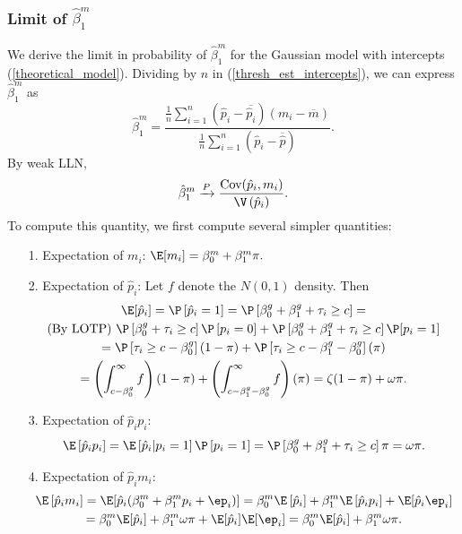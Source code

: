 \documentclass[12pt]{article}
\begin{document}
\subsubsection{Limit of $\hat{\beta}^m_1$}

We derive the limit in probability of $\hat{\beta}^m_1$ for the Gaussian model with intercepts (\ref{theoretical_model}). Dividing by $n$ in (\ref{thresh_est_intercepts}), we can express $\hat{\beta}^m_1$ as
$$ \hat{\beta}^m_1 = \frac{ \frac{1}{n} \sum_{i=1}^n ( \hat{p}_i - \overline{\hat{p}_i})(m_i - \overline{m})}{ \frac{1}{n} \sum_{i=1}^n (\hat{p}_i - \overline{\hat{p}})}.$$ By weak LLN,
$$ \hat{\beta}^m_1 \xrightarrow{P} \frac{\textrm{Cov}(\hat{p}_i, m_i)}{\V\left(\hat{p}_i\right)}.$$ To compute this quantity, we first compute several simpler quantities:
\begin{itemize}
\item[1.] Expectation of $m_i$: $\E[m_i] = \beta^m_0 + \beta^m_1\pi.$
\item[2.] Expectation of $\hat{p}_i$: Let $f$ denote the $N(0,1)$ density. Then \begin{multline*}
\E[\hat{p}_i] = \P\left[\hat{p}_i = 1\right] = \P\left[\beta^g_0 + \beta^g_1 + \tau_i \geq c \right] = \\ \textrm{(By LOTP) } \P\left[ \beta^g_0 + \tau_i \geq c \right]\P\left[p_i = 0\right] + \P\left[ \beta^g_0 + \beta^g_1 + \tau_i \geq c \right] \P[p_i = 1] \\ = \P\left[ \tau_i \geq c - \beta^g_0\right](1- \pi) + \P\left[ \tau_i \geq c - \beta^g_1 - \beta^g_0 \right](\pi) \\ = \left(\int_{c - \beta^g_0}^\infty f\right) (1 - \pi) + \left( \int_{c - \beta^g_1 - \beta^g_0}^\infty f \right)(\pi) = \zeta(1-\pi) + \omega \pi.
\end{multline*}
\item[3.] Expectation of $\hat{p}_i p_i$: 
$$\E\left[ \hat{p}_i p_i \right] = \E\left[ \hat{p}_i | p_i = 1 \right] \P\left[ p_i =1 \right] = \P\left[ \beta^g_0 + \beta^g_1 + \tau_i \geq c \right] \pi = \omega \pi.$$
\item[4.] Expectation of $\hat{p}_i m_i$:
\begin{multline*}
\E\left[\hat{p}_i m_i\right] = \E[\hat{p}_i (\beta^m_0 + \beta^m_1 p_i + \ep_i)] = \beta^m_0 \E\left[\hat{p}_i\right] + \beta^m_1 \E\left[\hat{p}_i p_i\right] + \E[\hat{p}_i \ep_i] \\ = \beta^m_0 \E[\hat{p}_i] + \beta^m_1 \omega \pi + \E[\hat{p}_i] \E[\ep_i] = \beta^m_0 \E[\hat{p}_i] + \beta^m_1 \omega \pi.

\end{multline*}
\end{itemize}
\end{document}
